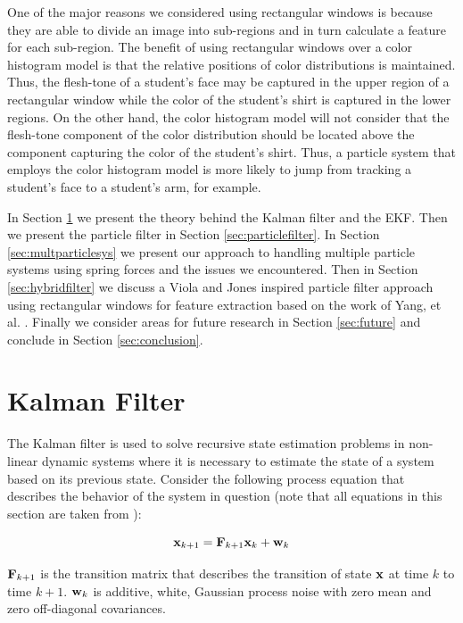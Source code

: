 \documentclass[11pt]{article}
\begin{document}
One of the major reasons we considered using rectangular windows is because they are able to divide an image into sub-regions and in turn calculate a feature for each sub-region. The benefit of using rectangular windows over a color histogram model is that the relative positions of color distributions is maintained. Thus, the flesh-tone of a student's face may be captured in the upper region of a rectangular window while the color of the student's shirt is captured in the lower regions. On the other hand, the color histogram model will not consider that the flesh-tone component of the color distribution should be located above the component capturing the color of the student's shirt. Thus, a particle system that employs the color histogram model is more likely to jump from tracking a student's face to a student's arm, for example.

In Section \ref{sec:kalmanfilter} we present the theory behind the Kalman filter and the EKF. Then we present the particle filter in Section \ref{sec:particlefilter}. In Section \ref{sec:multparticlesys} we present our approach to handling multiple particle systems using spring forces and the issues we encountered. Then in Section \ref{sec:hybridfilter} we discuss a Viola and Jones inspired particle filter approach using rectangular windows for feature extraction based on the work of Yang, et al. \cite{hybrid}. Finally we consider areas for future research in Section \ref{sec:future} and conclude in Section \ref{sec:conclusion}.
  


\section{Kalman Filter}
\label{sec:kalmanfilter}

The Kalman filter is used to solve recursive state estimation problems in non-linear dynamic systems where it is necessary to estimate the state of a system based on its previous state. Consider the following process equation that describes the behavior of the system in question (note that all equations in this section are taken from \cite{kalman}):

\begin{equation}
{\bf x}_{k+1} = {\bf F}_{k+1} {\bf x}_k + {\bf w}_k
\label{eq:process}
\end{equation}
\vspace{0.01cm}

${\bf F}_{k+1}$ is the transition matrix that describes the transition of state ${\bf x}$ at time $k$ to time $k + 1$. ${\bf w}_k$ is additive, white, Gaussian process noise with zero mean and zero off-diagonal covariances.  
\end{document}
